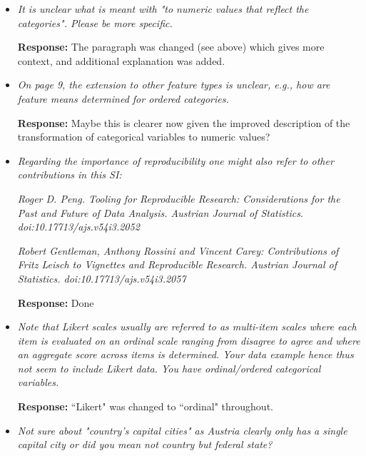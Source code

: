 \documentclass[12pt]{article}
\begin{document}
\begin{itemize}
    \textbf{Revised text (Section 2.4)}: With bit blit, the static elements of the display, such as the outer frames of the plots, are stored as a background image. When a plot is manipulated, only the affected plot is updated, and within that, only the interactive elements, such as the datapoints and projection axes in a 2D tour, are rendered on top of the background image.
    
    
	\item \textit{It is unclear what is meant with "to numeric values that reflect the categories". Please be more specific.}

    \textbf{Response:} The paragraph was changed (see above) which gives more context, and additional explanation was added.
        
    \item \textit{On page 9, the extension to other feature types is unclear, e.g., how are feature means determined for ordered categories.}

    \textbf{Response:} Maybe this is clearer now given the improved description of the transformation of categorical variables to numeric values?
    
    \item \textit{Regarding the importance of reproducibility one might also refer to other contributions in this SI:}

\textit{Roger D. Peng. Tooling for Reproducible Research: Considerations for the
Past and Future of Data Analysis. Austrian Journal of Statistics. doi:10.17713/ajs.v54i3.2052}

\textit{Robert Gentleman, Anthony Rossini and Vincent Carey: Contributions of Fritz Leisch to Vignettes and Reproducible Research. Austrian Journal of Statistics. doi:10.17713/ajs.v54i3.2057}

    \textbf{Response:} Done
        
    \item \textit{Note that Likert scales usually are referred to as multi-item scales where each item is evaluated on an ordinal scale ranging from disagree to agree and where an aggregate score across items is determined. Your data example hence thus not seem to include Likert data. You have ordinal/ordered categorical variables.}

    \textbf{Response:} ``Likert" was changed to ``ordinal" throughout.
    
    \item \textit{Not sure about "country's capital cities" as Austria clearly only has a single capital city or did you mean not country but federal state?}


\end{itemize}
\end{document}
